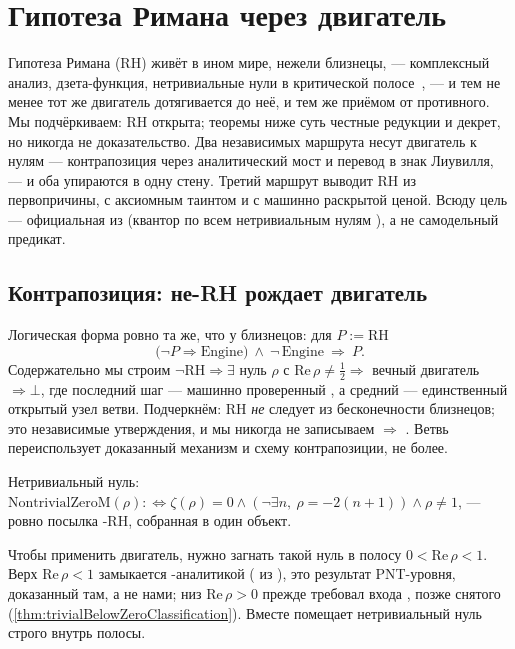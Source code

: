 \section{Гипотеза Римана через двигатель}\label{sec:riemann}

Гипотеза Римана (RH) живёт в ином мире, нежели близнецы, --- комплексный анализ, дзета-функция,
нетривиальные нули в критической полосе~\cite{clay-rh}, --- и тем не менее тот же двигатель
дотягивается до неё, и тем же приёмом от противного. Мы подчёркиваем: RH \red{} открыта; теоремы
ниже суть честные редукции и декрет, но никогда не доказательство. Два независимых маршрута несут
двигатель к нулям --- контрапозиция через аналитический мост и перевод в знак Лиувилля, --- и оба
упираются в одну стену. Третий маршрут выводит RH из первопричины, \yellow{} с аксиомным
таинтом и с машинно раскрытой ценой. Всюду цель --- официальная  из
 (квантор по всем нетривиальным нулям ), а не самодельный предикат.

\subsection{Контрапозиция: не-RH рождает двигатель}

Логическая форма ровно та же, что у близнецов: для $P := \mathrm{RH}$
\begin{equation}\label{eq:riemann-contraposition}
  \bigl(\neg P \Rightarrow \text{Engine}\bigr)\ \wedge\ \neg\,\text{Engine}\ \Longrightarrow\ P .
\end{equation}
Содержательно мы строим $\neg\mathrm{RH} \Rightarrow \exists$ нуль $\rho$ с
$\mathrm{Re}\,\rho \ne \tfrac12 \Rightarrow$ вечный двигатель $\Rightarrow \bot$, где последний шаг ---
машинно проверенный , а средний --- единственный открытый узел ветви.
Подчеркнём: RH \emph{не} следует из бесконечности близнецов; это независимые утверждения, и мы
никогда не записываем  $\Rightarrow$ . Ветвь переиспользует доказанный механизм и
схему контрапозиции, не более.

\begin{definition}\label{def:NontrivialZeroM}
Нетривиальный нуль:
$\mathrm{NontrivialZeroM}(\rho) :\Longleftrightarrow \zeta(\rho)=0 \wedge (\neg\exists n,\ \rho = -2(n{+}1)) \wedge \rho \ne 1$,
--- ровно посылка -RH, собранная в один объект.
\end{definition}

Чтобы применить двигатель, нужно загнать такой нуль в полосу $0<\mathrm{Re}\,\rho<1$. Верх
$\mathrm{Re}\,\rho<1$ замыкается -аналитикой ( из
), это результат PNT-уровня, доказанный там, а не нами;
низ $\mathrm{Re}\,\rho>0$ прежде требовал входа , позже
снятого (\cref{thm:trivialBelowZeroClassification}). Вместе  помещает
нетривиальный нуль строго внутрь полосы.

